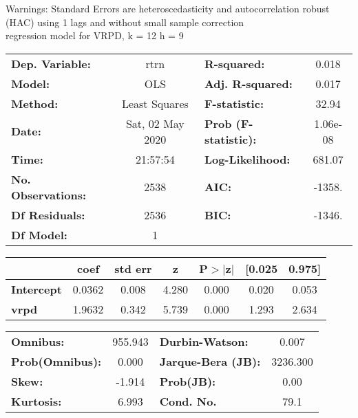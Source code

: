 Warnings: \newline
 [1] Standard Errors are heteroscedasticity and autocorrelation robust (HAC) using 1 lags and without small sample correction\\ 

regression model for VRPD, k = 12 h = 9\begin{center}
\begin{tabular}{lclc}
\toprule
\textbf{Dep. Variable:}    &       rtrn       & \textbf{  R-squared:         } &     0.018   \\
\textbf{Model:}            &       OLS        & \textbf{  Adj. R-squared:    } &     0.017   \\
\textbf{Method:}           &  Least Squares   & \textbf{  F-statistic:       } &     32.94   \\
\textbf{Date:}             & Sat, 02 May 2020 & \textbf{  Prob (F-statistic):} &  1.06e-08   \\
\textbf{Time:}             &     21:57:54     & \textbf{  Log-Likelihood:    } &    681.07   \\
\textbf{No. Observations:} &        2538      & \textbf{  AIC:               } &    -1358.   \\
\textbf{Df Residuals:}     &        2536      & \textbf{  BIC:               } &    -1346.   \\
\textbf{Df Model:}         &           1      & \textbf{                     } &             \\
\bottomrule
\end{tabular}
\begin{tabular}{lcccccc}
                   & \textbf{coef} & \textbf{std err} & \textbf{z} & \textbf{P$> |$z$|$} & \textbf{[0.025} & \textbf{0.975]}  \\
\midrule
\textbf{Intercept} &       0.0362  &        0.008     &     4.280  &         0.000        &        0.020    &        0.053     \\
\textbf{vrpd}      &       1.9632  &        0.342     &     5.739  &         0.000        &        1.293    &        2.634     \\
\bottomrule
\end{tabular}
\begin{tabular}{lclc}
\textbf{Omnibus:}       & 955.943 & \textbf{  Durbin-Watson:     } &    0.007  \\
\textbf{Prob(Omnibus):} &   0.000 & \textbf{  Jarque-Bera (JB):  } & 3236.300  \\
\textbf{Skew:}          &  -1.914 & \textbf{  Prob(JB):          } &     0.00  \\
\textbf{Kurtosis:}      &   6.993 & \textbf{  Cond. No.          } &     79.1  \\
\bottomrule
\end{tabular}
\end{center}


